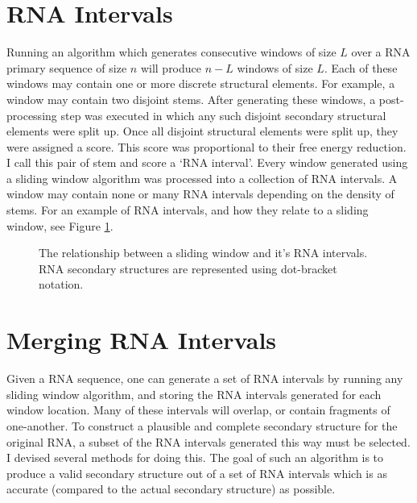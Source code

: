 \documentclass{cshonours}
\begin{document}
\section{RNA Intervals}
Running an algorithm which generates consecutive windows of size $L$ over a RNA primary sequence of size $n$ will produce $n-L$ windows of size $L$. Each of these windows may contain one or more discrete structural elements. For example, a window may contain two disjoint stems. After generating these windows, a post-processing step was executed in which any such disjoint secondary structural elements were split up. Once all disjoint structural elements were split up, they were assigned a score. This score was proportional to their free energy reduction. I call this pair of stem and score a `RNA interval'. Every window generated using a sliding window algorithm was processed into a collection of RNA intervals. A window may contain none or many RNA intervals depending on the density of stems. For an example of RNA intervals, and how they relate to a sliding window, see Figure \ref{fig:rnainterval}.


\begin{figure}
\begin{center}
\end{center}
\caption{The relationship between a sliding window and it's RNA intervals. RNA secondary structures are represented using dot-bracket notation.}
\label{fig:rnainterval}
\end{figure}




\section{Merging RNA Intervals}
\label{sec:merging}

Given a RNA sequence, one can generate a set of RNA intervals by running any sliding window algorithm, and storing the RNA intervals generated for each window location. Many of these intervals will overlap, or contain fragments of one-another. To construct a plausible and complete secondary structure for the original RNA, a subset of the RNA intervals generated this way must be selected. I devised several methods for doing this. The goal of such an algorithm is to produce a valid secondary structure out of a set of RNA intervals which is as accurate (compared to the actual secondary structure) as possible.
\end{document}
